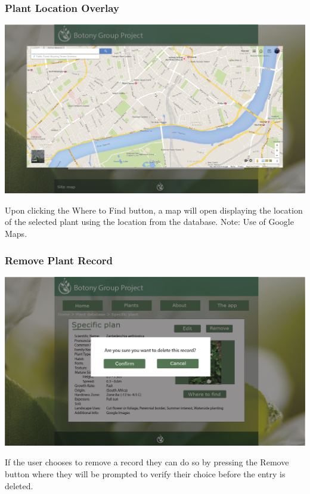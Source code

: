 			\subsubsection{Plant Location Overlay}
			\begin{center}
				\includegraphics[scale=0.5]{uiDesign/uiwebimages/map.png}
			\end{center}
			Upon clicking the Where to Find button, a map will open displaying the location of the selected plant using the location from the database. Note: Use of Google Maps.

		\subsubsection{Remove Plant Record}
			\begin{center}
				\includegraphics[scale=0.5]{uiDesign/uiwebimages/delete.png}
			\end{center}
			If the user chooses to remove a record they can do so by pressing the Remove button where they will be prompted to verify their choice before the entry is deleted.